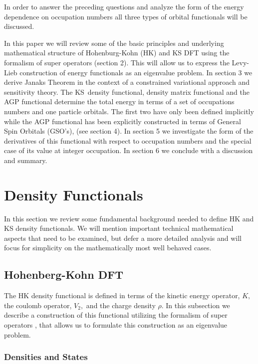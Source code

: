 \documentclass[aps,preprint]{revtex4}%
\begin{document}
In order to answer the preceding questions and analyze the form of the energy
dependence on occupation numbers all three types of orbital functionals will
be discussed.

In this paper we will review some of the basic principles and underlying
mathematical structure of Hohenburg-Kohn (HK) \cite{HK1964} and KS DFT using
the formalism of super operators (section 2). This will allow us to express
the Levy-Lieb construction of energy functionals as an eigenvalue problem. In
section 3 we derive Janaks Theorem in the context of a constrained variational
approach and sensitivity theory. The KS\ density functional, density matrix
functional and the AGP functional determine the total energy in terms of a set
of occupations numbers and one particle orbitals. The first two have only been
defined implicitly while the AGP functional has been explicitly constructed
\cite{OrtizWeiner2006} in terms of General Spin Orbitals (GSO's), (see section
4). In section 5 we investigate the form of the derivatives of this functional
with respect to occupation numbers and the special case of its value at
integer occupation. In section 6 we conclude with a discussion and summary.

\section{Density Functionals \label{Standard}}

In this section we review some fundamental background needed to define HK and
KS density functionals. We will mention important technical mathematical
aspects that need to be examined, but defer a more detailed analysis and will
focus for simplicity on the mathematically most well behaved cases.

\subsection{Hohenberg-Kohn DFT\label{HKDFT}}

The HK density functional is defined in terms of the kinetic energy operator,
$K,$ the coulomb operator, $V_{2},$ and the charge density $\rho$. In this
subsection we describe a construction of this functional utilizing the
formalism of super operators \cite{Lowdin1982}, that allows us to formulate
this construction as an eigenvalue problem.

\subsubsection{Densities and States\label{DenStat}}
\end{document}
